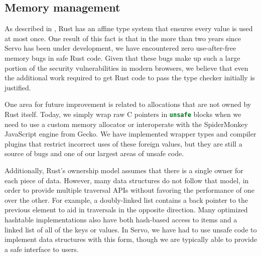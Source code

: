 \subsection{Memory management}
As described in , Rust has an affine type system that ensures every value is used at
most once.
One result of this fact is that in the more than two years since Servo has been under development, we have
encountered zero use-after-free memory bugs in safe Rust code.
Given that these bugs make up such a large portion of the security vulnerabilities in modern browsers,
we believe that even the additional work required to get Rust code to pass the type checker initially is
justified.

One area for future improvement is related to allocations that are not owned by Rust itself.
Today, we simply wrap raw C pointers in \lstinline[language=Rust]{unsafe} blocks when we need to use a
custom memory allocator or interoperate with the SpiderMonkey JavaScript engine from Gecko.
We have implemented wrapper types and compiler plugins that restrict incorrect uses of these foreign values,
but they are still a source of bugs and one of our largest areas of unsafe code.

Additionally, Rust's ownership model assumes that there is a single owner for each piece of data.
However, many data structures do not follow that model, in order to provide multiple traversal
APIs without favoring the performance of one over the other.
For example, a doubly-linked list contains a back pointer to the previous element to aid
in traversals in the opposite direction.
Many optimized hashtable implementations also have both hash-based access to items
and a linked list of all of the keys or values.
In Servo, we have had to use unsafe code to implement data structures with this form,
though we are typically able to provide a safe interface to users.

